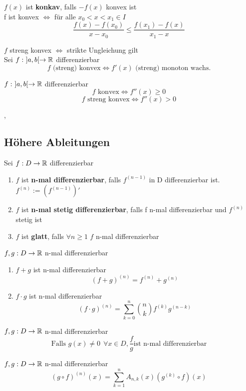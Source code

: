\Bem $f(x)$ ist \textbf{konkav}, falls $-f(x)$ konvex ist \\

\Lemma[4.2.15] f ist konvex $\Leftrightarrow$ für alle $x_0 < x < x_1 \in I$
\[ \frac{f(x) - f(x_0)}{x - x_0} \leq \frac{f(x_1) - f(x)}{x_1 - x} \]

\Bem $f$ streng konvex $\Leftrightarrow$ strikte Ungleichung gilt \\

\Satz[4.2.16] Sei $f : \ ]a, b[ \rightarrow \mathbb{R}$ differenzierbar
\[ f \text{ (streng) konvex} \Leftrightarrow f'(x)  \text{ (streng) monoton wachs.} \]

\Korollar[4.2.17] $f : \ ]a, b[ \rightarrow \mathbb{R}$ differenzierbar
\[ f \text{ konvex} \Leftrightarrow f''(x)  \geq 0 \]
\[ f \text{ streng konvex} \Leftrightarrow f''(x)  > 0 \]

\sep

\subsection{Höhere Ableitungen}

\Def[4.3.1] Sei $f : D \rightarrow \mathbb{R}$ differenzierbar
\begin{enumerate}
\item $f$ ist \textbf{n-mal differenzierbar}, falls $f^{(n -1)}$ in D differenzierbar ist. $f^{(n)} := (f^{(n-1)})'$
\item $f$ ist \textbf{n-mal stetig differenzierbar}, falls f n-mal differenzierbar und $f^{(n)}$ stetig ist
\item $f$ ist \textbf{glatt}, falls $\forall n \geq 1$ $f$ n-mal differenzierbar
\end{enumerate}

\Satz[4.3.3] $f, g : D \rightarrow \mathbb{R}$ n-mal differenzierbar
\begin{enumerate}
\item $f + g$ ist n-mal differenzierbar
\[ (f + g)^{(n)} = f^{(n)} + g^{(n)} \] 
\item $f \cdot g$ ist n-mal differenzierbar
\[ (f \cdot g)^{(n)} = \sum_{k=0}^n \binom{n}{k} f^{(k)} g^{(n - k)} \]
\end{enumerate}

\Satz[4.3.5] $f, g : D \rightarrow \mathbb{R}$ n-mal differenzierbar
\[ \text{Falls } g(x) \neq 0 \ \ \forall x \in D, \frac{f}{g} \text {ist n-mal differenzierbar} \]

\Satz[4.3.6] $f,g : D \rightarrow \mathbb{R}$ n-mal differenzierbar 
\[(g \circ f)^{(n)} (x) = \sum_{k=1}^n A_{n,k}(x) (g^{(k)} \circ f) (x) \]

